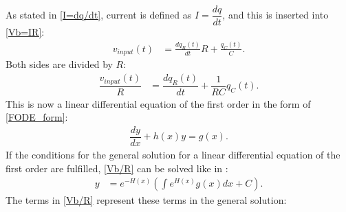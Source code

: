 As stated in \eqref{I=dq/dt}, current is defined as $I =\dfrac{dq}{dt}$, and this is inserted into \eqref{Vb=IR}:
 \begin{align*}
 	v_{input}(t) &= \frac{dq_R(t)}{dt} R + \frac{q_C (t)}{C}.
 \end{align*}
Both sides are divided by $R$:
\begin{align}
\dfrac{v_{input}(t)}{R} &= \dfrac{dq_R(t)}{dt} + \dfrac{1}{RC}q_C(t).\label{Vb/R} 
\end{align}
This is now a linear differential equation of the first order in the form of \eqref{FODE_form}:
\begin{align*}
\dfrac{dy}{dx}+h(x)y=g(x).
\end{align*}
If the conditions for the general solution for a linear differential equation of the first order are fulfilled, \eqref{Vb/R} can be solved like in :
\begin{align*}
y&=e^{-H(x)}\left(\int e^{H(x)}g(x)dx+C\right).
\end{align*}
The terms in \eqref{Vb/R} represent these terms in the general solution:


